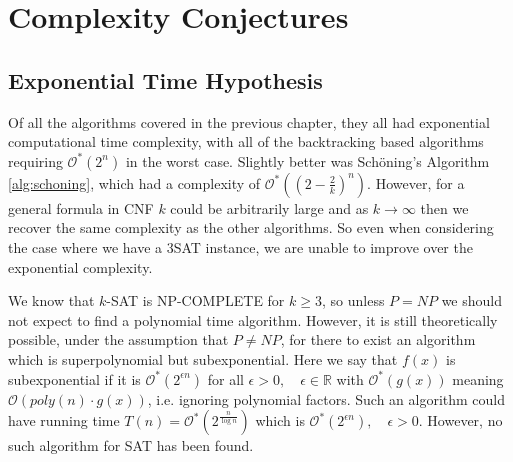 \chapter{Complexity Conjectures} \label{chap:complexity}

\ifpdf
    \graphicspath{{Chapter3/Figs/Raster/}{Chapter3/Figs/PDF/}{Chapter3/Figs/}}
\else
    \graphicspath{{Chapter3/Figs/Vector/}{Chapter3/Figs/}}
\fi

\section{Exponential Time Hypothesis}
Of all the algorithms covered in the previous chapter, they all had exponential computational
time complexity, with all of the backtracking based algorithms requiring $\mathcal{O}^*(2^n)$ in the worst case. Slightly better was
Sch\"oning's Algorithm \ref{alg:schoning}, which had a complexity of
$\mathcal{O}^*((2 - \frac{2}{k})^n)$. However, for a general formula in CNF
$k$ could be arbitrarily large and as $k \to \infty$ then we recover the same
complexity as the other algorithms. So even when considering the case where we
have a 3SAT instance, we are unable to improve over the
exponential complexity.


We know that $k$-SAT is NP-COMPLETE for $k \geq 3$\cite{schaefer1978complexity},
so unless $P = NP$ we should not expect to find a polynomial time algorithm.
However, it is still theoretically possible, under the assumption that $P \neq NP$, for there to exist an algorithm which is superpolynomial but subexponential.
Here we say that $f(x)$ is subexponential if it is $\mathcal{O}^{\ast}(2^{\epsilon n})$ for all
$\epsilon > 0, \quad \epsilon \in \mathbb{R}$ with $\mathcal{O}^{\ast}(g(x))$ meaning $\mathcal{O}(poly(n) \cdot g(x))$,
i.e. ignoring polynomial factors. Such an algorithm
could have running time $T(n) = \mathcal{O}^{\ast}(2^{\frac{n}{\log n}})$ which is 
$\mathcal{O}^{\ast}(2^{\epsilon n}),\quad \epsilon > 0$.
However, no such algorithm for SAT has been found.

